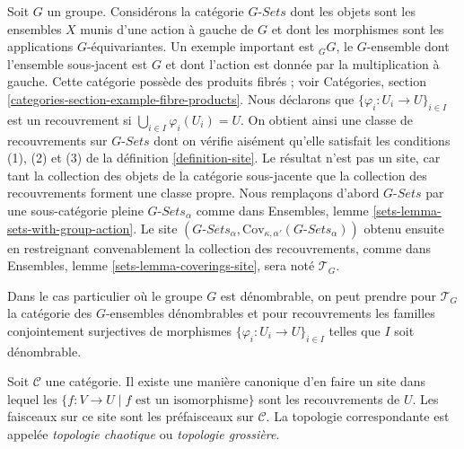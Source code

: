 \begin{example}
\label{example-site-on-group}
Soit $G$ un groupe. Considérons la catégorie $G\textit{-Sets}$ dont les objets
sont les ensembles $X$ munis d’une action à gauche de $G$ et dont les
morphismes sont les applications $G$-équivariantes. Un exemple important est
${}_GG$, le $G$-ensemble dont l’ensemble sous-jacent est $G$ et dont l’action
est donnée par la multiplication à gauche. Cette catégorie possède des
produits fibrés ; voir Catégories,
section \ref{categories-section-example-fibre-products}.
Nous déclarons que $\{\varphi_i : U_i \to U\}_{i\in I}$ est un recouvrement si
$\bigcup_{i\in I} \varphi_i(U_i) = U$. On obtient ainsi une classe de
recouvrements sur $G\textit{-Sets}$ dont on vérifie aisément qu’elle satisfait
les conditions (1), (2) et (3) de la définition \ref{definition-site}. Le
résultat n’est pas un site, car tant la collection des objets de la catégorie
sous-jacente que la collection des recouvrements forment une classe propre.
Nous remplaçons d’abord $G\textit{-Sets}$ par une sous-catégorie pleine
$G\textit{-Sets}_\alpha$ comme dans Ensembles,
lemme \ref{sets-lemma-sets-with-group-action}. Le site
$(G\textit{-Sets}_\alpha,
\text{Cov}_{\kappa, \alpha'}(G\textit{-Sets}_\alpha))$
obtenu ensuite en restreignant convenablement la collection des recouvrements,
comme dans Ensembles, lemme \ref{sets-lemma-coverings-site}, sera noté
$\mathcal{T}_G$.

\medskip\noindent
Dans le cas particulier où le groupe $G$ est dénombrable, on peut prendre
pour $\mathcal{T}_G$ la catégorie des $G$-ensembles dénombrables et pour
recouvrements les familles conjointement surjectives de morphismes
$\{\varphi_i : U_i \to U\}_{i \in I}$ telles que $I$ soit dénombrable.
\end{example}

\begin{example}
\label{example-indiscrete}
Soit $\mathcal{C}$ une catégorie. Il existe une manière canonique d’en faire
un site dans lequel les $\{f : V \to U \mid f\text{ est un isomorphisme}\}$
sont les recouvrements de $U$. Les faisceaux sur ce site sont les préfaisceaux
sur $\mathcal{C}$. La topologie correspondante est appelée {\it topologie
chaotique} ou {\it topologie grossière}.
\end{example}













